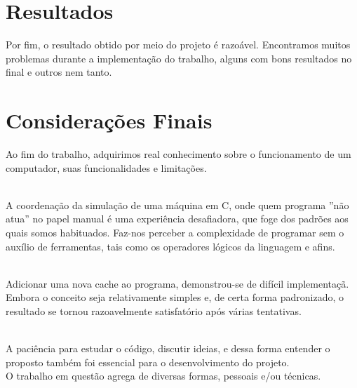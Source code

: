 \documentclass{article}
\begin{document}
\clearpage
\section{Resultados}
Por fim, o resultado obtido por meio do projeto é razoável. Encontramos muitos problemas durante a implementação do trabalho, alguns com bons resultados no final e outros nem tanto.\\ 

\clearpage
\section{Considerações Finais}
Ao fim do trabalho, adquirimos real conhecimento sobre o funcionamento de um computador, suas funcionalidades e limitações.  

\\A coordenação da simulação de uma máquina em C, onde quem programa ''não atua'' no papel manual é uma experiência desafiadora, que foge dos padrões aos quais somos habituados. Faz-nos perceber a complexidade de programar sem o auxílio de ferramentas, tais como os operadores lógicos da linguagem e afins.

\\Adicionar uma nova cache ao programa, demonstrou-se de difícil implementaçã. Embora o conceito seja relativamente simples e, de certa forma padronizado, o resultado se tornou razoavelmente satisfatório após várias tentativas.

\\A paciência para estudar o código, discutir ideias, e dessa forma entender o proposto também foi essencial para o desenvolvimento do projeto.
\\O trabalho em questão agrega de diversas formas, pessoais e/ou técnicas.
\clearpage

\clearpage


\end{document}
